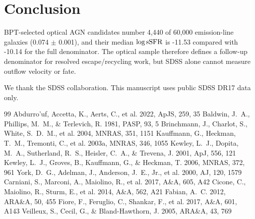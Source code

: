 \documentclass[twocolumn]{aastex631}
\begin{document}
\section{Conclusion}\label{sec:conclusion}
BPT-selected optical AGN candidates number 4,440 of 60,000 emission-line galaxies (0.074 $\pm$ 0.001), and their median $\log {\rm sSFR}$ is -11.53 compared with -10.14 for the full denominator. The optical sample therefore defines a follow-up denominator for resolved escape/recycling work, but SDSS alone cannot measure outflow velocity or fate.

\begin{acknowledgments}
We thank the SDSS collaboration. This manuscript uses public SDSS DR17 data only.
\end{acknowledgments}
\begin{thebibliography}{99}
 Abdurro'uf, Accetta, K., Aerts, C., et al. 2022, ApJS, 259, 35
 Baldwin, J.~A., Phillips, M.~M., \& Terlevich, R. 1981, PASP, 93, 5
 Brinchmann, J., Charlot, S., White, S.~D.~M., et al. 2004, MNRAS, 351, 1151
 Kauffmann, G., Heckman, T.~M., Tremonti, C., et al. 2003a, MNRAS, 346, 1055
 Kewley, L.~J., Dopita, M.~A., Sutherland, R.~S., Heisler, C.~A., \& Trevena, J. 2001, ApJ, 556, 121
 Kewley, L.~J., Groves, B., Kauffmann, G., \& Heckman, T. 2006, MNRAS, 372, 961
 York, D.~G., Adelman, J., Anderson, J.~E., Jr., et al. 2000, AJ, 120, 1579
 Carniani, S., Marconi, A., Maiolino, R., et al. 2017, A\&A, 605, A42
 Cicone, C., Maiolino, R., Sturm, E., et al. 2014, A\&A, 562, A21
 Fabian, A.~C. 2012, ARA\&A, 50, 455
 Fiore, F., Feruglio, C., Shankar, F., et al. 2017, A\&A, 601, A143
 Veilleux, S., Cecil, G., \& Bland-Hawthorn, J. 2005, ARA\&A, 43, 769
\end{thebibliography}
\end{document}
